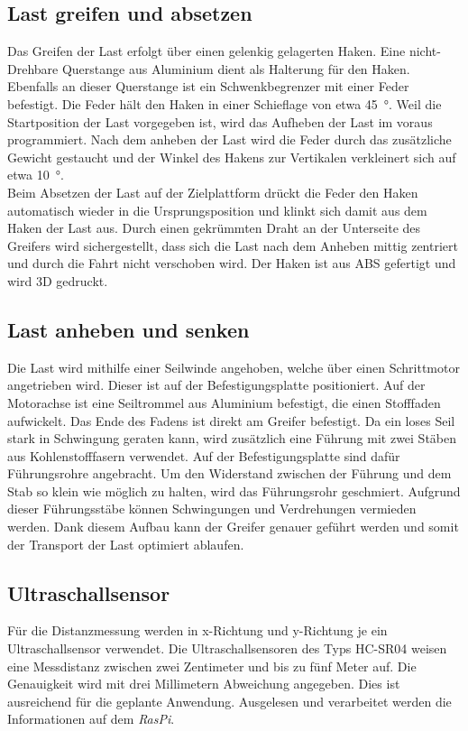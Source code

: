 \documentclass[a4paper]{report}
\begin{document}
\subsection{Last greifen und absetzen}
Das Greifen der Last erfolgt über einen gelenkig gelagerten Haken.  Eine nicht-Drehbare Querstange aus Aluminium dient als Halterung für den Haken. Ebenfalls an dieser Querstange ist ein Schwenkbegrenzer mit einer Feder befestigt. Die Feder hält den Haken in einer Schieflage von etwa 45\SI{}{\degree}. Weil die Startposition der Last vorgegeben ist, wird das Aufheben der Last im voraus programmiert.
Nach dem anheben der Last wird die Feder durch das zusätzliche Gewicht gestaucht und der Winkel des Hakens zur Vertikalen verkleinert sich auf etwa 10\SI{}{\degree}.\\
Beim Absetzen der Last auf der Zielplattform drückt die Feder den Haken automatisch wieder in die Ursprungsposition und klinkt sich damit aus dem Haken der Last aus.
Durch einen gekrümmten Draht an der Unterseite des Greifers wird sichergestellt, dass sich die Last nach dem Anheben mittig zentriert und durch die Fahrt nicht verschoben wird. %
Der Haken ist aus ABS gefertigt und wird 3D gedruckt.

\subsection{Last anheben und senken}
Die Last wird mithilfe einer Seilwinde angehoben, welche über einen Schrittmotor angetrieben wird. Dieser ist auf der Befestigungsplatte positioniert. Auf der Motorachse ist eine Seiltrommel aus Aluminium befestigt, die einen Stofffaden aufwickelt. Das Ende des Fadens ist direkt am Greifer befestigt. %
Da ein loses Seil stark in Schwingung geraten kann, wird zusätzlich eine Führung mit zwei Stäben aus Kohlenstofffasern verwendet. Auf der Befestigungsplatte sind dafür Führungsrohre angebracht. Um den Widerstand zwischen der Führung und dem Stab so klein wie möglich zu halten, wird das Führungsrohr geschmiert. Aufgrund dieser Führungsstäbe können Schwingungen und Verdrehungen vermieden werden.
Dank diesem Aufbau kann der Greifer genauer geführt werden und somit der Transport der Last optimiert ablaufen.

\subsection{Ultraschallsensor}
Für die Distanzmessung werden in x-Richtung und y-Richtung je ein Ultraschallsensor verwendet. Die Ultraschallsensoren des Typs HC-SR04 weisen eine Messdistanz zwischen zwei Zentimeter und bis zu fünf Meter auf. Die Genauigkeit wird mit drei Millimetern Abweichung angegeben. Dies ist ausreichend für die geplante Anwendung. Ausgelesen und verarbeitet werden die Informationen auf dem \textit{RasPi}.
\end{document}
